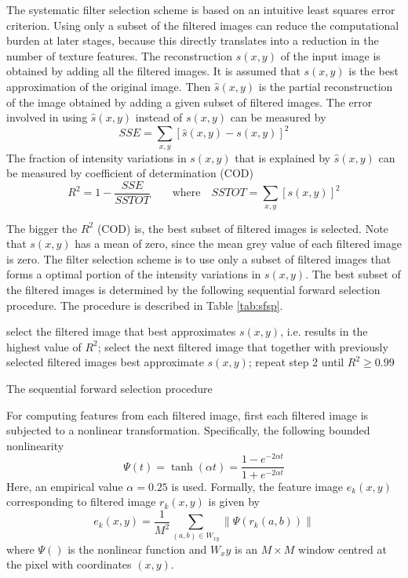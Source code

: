 The systematic filter selection scheme is based on an intuitive least squares error criterion. Using only a subset of the filtered images can reduce the computational burden at later stages, because this directly translates into a reduction in the number of texture features. The reconstruction $s(x, y)$ of the input image is obtained by adding all the filtered images. It is assumed that $s(x, y)$ is the best approximation of the original image. Then $\hat{s}(x,y)$ is the partial reconstruction of the image obtained by adding a given subset of filtered images. The error involved in using $\hat{s}(x,y)$ instead of $s(x, y)$ can be measured by 
\begin{equation}
 SSE = \sum_{x,y}[\hat{s}(x,y)-s(x, y)]^2
\end{equation}
The fraction of intensity variations in $s(x, y)$ that is explained by $\hat{s}(x,y)$ can be measured by coefficient of determination (COD)
\begin{equation}
 R^2=1-\frac{SSE}{SSTOT} \qquad \textrm{where} \quad SSTOT = \sum_{x,y}[s(x,y)]^2
\end{equation}

The bigger the $R^2$ (COD) is, the best subset of filtered images is selected. Note that $s(x, y)$ has a mean of zero, since the mean grey value of each filtered image is zero. The filter selection scheme is to use only a subset of filtered images that forms a optimal portion of the intensity variations in $s(x, y)$. The best subset of the filtered images is determined by the following sequential forward selection procedure. The procedure is described in \mbox{Table} \ref{tab:sfsp}.
\begin{table}[ht]
 \begin{algorithmic}[1]
  \STATE select the filtered image that best approximates $s(x, y)$, i.e. results in the highest value of $R^2$;
  \STATE select the next filtered image that together with previously selected filtered images best approximate $s(x, y)$;
  \STATE repeat step 2 until $R^2\ge 0.99$
 \end{algorithmic}

\caption{The sequential forward selection procedure}
\label{tab:sfsp}
\end{table} 

For computing features from each filtered image, first each filtered image is subjected to a nonlinear transformation. Specifically, the following bounded nonlinearity
\begin{equation}
 \Psi(t)=\tanh(\alpha t)=\frac{1-e^{-2\alpha t}}{1+e^{-2\alpha t}}
\end{equation}
Here, an empirical value $\alpha=0.25$ is used. Formally, the feature image $e_k(x, y)$ corresponding to filtered image $r_k(x, y)$ is given by
\begin{equation}
 e_k(x,y)=\frac{1}{M^2}\sum_{(a,b)\in W_{xy}} \|\Psi(r_k(a,b))\|
\end{equation}
where $\Psi()$ is the nonlinear function and $W_xy$ is an $M\times M$ window centred at the pixel with coordinates $(x, y)$.

